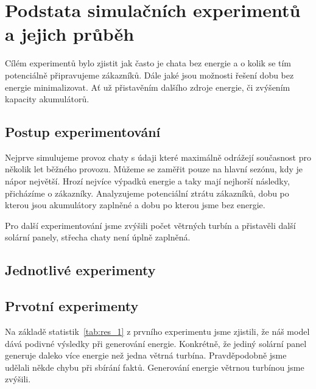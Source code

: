 \section{Podstata simulačních experimentů a jejich průběh}

Cílém experimentů bylo zjistit jak často je chata bez energie a o kolik se tím potenciálně připravujeme zákazníků. Dále jaké jsou možnosti řešení dobu bez energie minimalizovat. Ať už přistavěním dalšího zdroje energie, či zvýšením kapacity akumulátorů.



\subsection{Postup experimentování}

Nejprve simulujeme provoz chaty s údaji které maximálně odrážejí současnost pro několik let běžného provozu. Můžeme se zaměřit pouze na hlavní sezónu, kdy je nápor největší. Hrozí nejvíce výpadků energie a taky mají nejhorší následky, přicházíme o zákazníky. Analyzujeme potenciální ztrátu zákazníků, dobu po kterou jsou akumulátory zaplněné a dobu po kterou jsme bez energie.

Pro další experimentování jsme zvýšili počet větrných turbín a přistavěli další solární panely, střecha chaty není úplně zaplněná.



\subsection{Jednotlivé experimenty}

\subsection{Prvotní experimenty}

Na základě statistik~\ref{tab:res_1} z prvního experimentu jsme zjistili, že náš model dává podivné výsledky při generování energie. Konkrétně, že jediný solární panel generuje daleko více energie než jedna větrná turbína. Pravděpodobně jsme udělali někde chybu při sbírání faktů. Generování energie větrnou turbínou jsme zvýšili.


